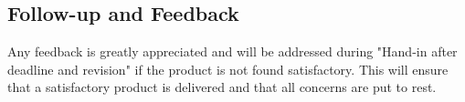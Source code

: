 \subsection{Follow-up and Feedback}

Any feedback is greatly appreciated and will be addressed during "Hand-in after deadline and revision" if the product is not found satisfactory. This will ensure that a satisfactory product is delivered and that all concerns are put to rest.



